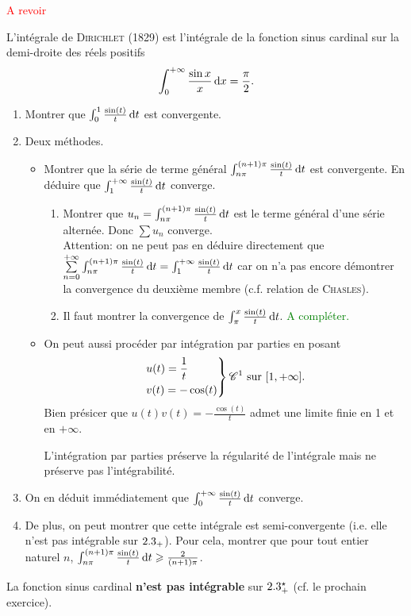 \textcolor{red}{A revoir}
\begin{tcolorbox}
    L'intégrale de \textsc{Dirichlet} (1829) est l'intégrale de la fonction sinus cardinal sur la demi-droite des réels positifs
    $$\int_{0}^{+\infty} \frac{\sin x}{x} \, \mathrm{d} x = \frac{\pi}{2}.$$
\end{tcolorbox}

\begin{preuve}
    \begin{enumerate}
        \item Montrer que $\int_{0}^{1} \frac{\sin (t)}{t} \, \mathrm{d} t$ est convergente. 
        \item Deux méthodes.
        \begin{itemize}
            \item Montrer que la série de terme général $\int_{n \pi}^{(n+1) \pi} \frac{\sin(t)}{t} \, \mathrm{d} t$ est convergente. En déduire que $\int_{1}^{+ \infty} \frac{\sin(t)}{t} \, \mathrm{d} t$ converge. 
            \begin{enumerate}
                \item Montrer que $u_n = \int_{n \pi}^{(n+1) \pi} \frac{\sin(t)}{t} \, \mathrm{d} t$ est le terme général d'une série alternée. Donc $\sum u_n$ converge.\\
                Attention: on ne peut pas en déduire directement que $\sum\limits_{n=0}^{+ \infty} \int_{n \pi}^{(n+1) \pi} \frac{\sin(t)}{t} \, \mathrm{d} t = \int_{1}^{+ \infty} \frac{\sin(t)}{t} \, \mathrm{d} t$ car on n'a pas encore démontrer la convergence du deuxième membre (c.f. relation de \textsc{Chasles}).\\
                \item Il faut montrer la convergence de $\int_{\pi}^{x} \frac{\sin (t)}{t} \, \mathrm{d} t$. \textcolor{green}{A compléter.}
            \end{enumerate}
            \item On peut aussi procéder par intégration par parties en posant
            $$
            \begin{drcases}                
                u(t) = \frac{1}{t}\\
                v(t) = - \cos(t)
            \end{drcases}
            \mathscr{C}^1 \text{ sur } [1, +\infty].
            $$
            Bien présicer que $u(t)v(t)=-\frac{\cos(t)}{t}$ admet une limite finie en 1 et en $+ \infty$.\\
            \begin{remarque}
                L'intégration par parties préserve la régularité de l'intégrale mais ne préserve pas l'intégrabilité.
            \end{remarque}
        \end{itemize}
        \item On en déduit immédiatement que $\int_{0}^{+ \infty} \frac{\sin (t)}{t} \, \mathrm{d} t$ converge.
        \item De plus, on peut montrer que cette intégrale est semi-convergente (i.e. elle n'est pas intégrable sur $2.3_+$). Pour cela, montrer que pour tout entier naturel $n$, $\int_{n \pi}^{(n+1) \pi} \frac{\sin(t)}{t} \, \mathrm{d} t \geqslant \frac{2}{(n+1) \pi}$. 
    \end{enumerate}
\end{preuve}
    
\begin{remarque}
    La fonction sinus cardinal \textbf{n'est pas intégrable} sur $2.3^\star_+$ (cf. le prochain exercice).
\end{remarque}
